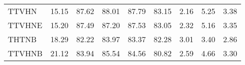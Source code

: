 \begin{table}
\begin{tabular}{lrrrrrrrr}
TTVHN                 &       15.15 &    87.62 &      88.01 &   87.79 &  83.15 &             2.16 &         5.25 &  3.38 \\
TTVHNE                &       15.20 &    87.49 &      87.20 &   87.53 &  83.05 &             2.32 &         5.16 &  3.35 \\
THTNB                 &       18.29 &    82.22 &      83.97 &   83.37 &  82.28 &             3.01 &         3.40 &  2.86 \\
TTVHNB                &       21.12 &    83.94 &      85.54 &   84.56 &  80.82 &             2.59 &         4.66 &  3.30 \\
\bottomrule
\end{tabular}
\end{table}
